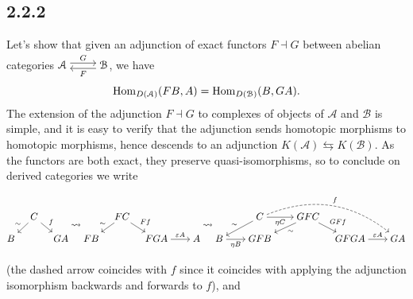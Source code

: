 \documentclass[deligne.tex]{subfiles}
\begin{document}
\subsection*{2.2.2}
Let's show that given an adjunction of exact functors $F\dashv G$ between
abelian categories 
$\begin{tikzcd}[cramped]\mathcal A\arrow[r,"G",shift left]&\mathcal B\arrow[l,"F",shift left]\end{tikzcd}$, we have
\begin{equation*}
	\operatorname{Hom}_{D(\mathcal A)}(FB,A)=\operatorname{Hom}_{D(\mathcal B)}(B,GA).
\end{equation*}
The extension of the adjunction $F\dashv G$ to complexes of objects of 
$\mathcal A$ and $\mathcal B$ is simple, and it is easy to verify that
the adjunction sends homotopic morphisms to homotopic morphisms, hence
descends to an adjunction $K(\mathcal A)\leftrightarrows K(\mathcal B)$.
As the functors are both exact, they preserve quasi-isomorphisms, so to
conclude on derived categories we write
{\small\begin{ceqn}\begin{equation*}
\begin{tikzcd}[cramped,column sep=10pt,row sep=10pt]
	&C\arrow[dl,"\sim"']\arrow[dr,"f"] \\
	B&&GA
\end{tikzcd}
\rightsquigarrow
\begin{tikzcd}[cramped,column sep=10pt,row sep=10pt]
	&FC\arrow[dl,"\sim"']\arrow[dr,"Ff"] \\
	FB&&FGA\arrow[r,"\vep A"]&[10pt]A
\end{tikzcd}
\rightsquigarrow
\begin{tikzcd}[cramped,column sep=10pt,row sep=10pt]
	&[10pt]C\arrow[drrr,dashed,bend left,"f"]\arrow[r,"\eta C"']\arrow[dl,"\sim"']&[10pt]GFC\arrow[dl,"\sim"]\arrow[dr,"GFf"] \\
	B\arrow[r,"\eta B"']&GFB&&GFGA\arrow[r,"\vep A"]&[10pt]GA
\end{tikzcd}
\end{equation*}\end{ceqn}}
(the dashed arrow coincides with $f$ since it coincides with applying
the adjunction isomorphism backwards and forwards to $f$), and
\end{document}
